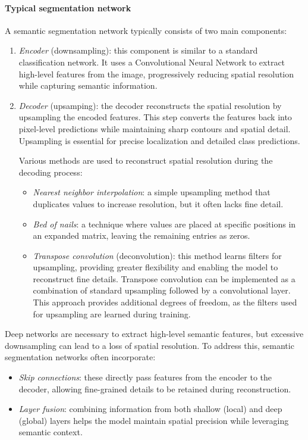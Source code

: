 \paragraph*{Typical segmentation network}
A semantic segmentation network typically consists of two main components:
\begin{enumerate}
    \item \textit{Encoder} (downsampling): this component is similar to a standard classification network. 
        It uses a Convolutional Neural Network to extract high-level features from the image, progressively reducing spatial resolution while capturing semantic information.
    \item \textit{Decoder} (upsamping): the decoder reconstructs the spatial resolution by upsampling the encoded features. 
        This step converts the features back into pixel-level predictions while maintaining sharp contours and spatial detail. 
        Upsampling is essential for precise localization and detailed class predictions.
        
        Various methods are used to reconstruct spatial resolution during the decoding process:
        \begin{itemize}
            \item \textit{Nearest neighbor interpolation}: a simple upsampling method that duplicates values to increase resolution, but it often lacks fine detail.
            \item \textit{Bed of nails}: a technique where values are placed at specific positions in an expanded matrix, leaving the remaining entries as zeros.
            \item \textit{Transpose convolution} (deconvolution): this method learns filters for upsampling, providing greater flexibility and enabling the model to reconstruct fine details.
                Transpose convolution can be implemented as a combination of standard upsampling followed by a convolutional layer.
                This approach provides additional degrees of freedom, as the filters used for upsampling are learned during training.
        \end{itemize}
\end{enumerate}
Deep networks are necessary to extract high-level semantic features, but excessive downsampling can lead to a loss of spatial resolution. 
To address this, semantic segmentation networks often incorporate:
\begin{itemize}
    \item \textit{Skip connections}: these directly pass features from the encoder to the decoder, allowing fine-grained details to be retained during reconstruction.
    \item \textit{Layer fusion}: combining information from both shallow (local) and deep (global) layers helps the model maintain spatial precision while leveraging semantic context.
\end{itemize}

